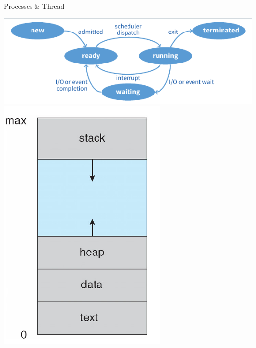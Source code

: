 \documentclass[10pt]{beamer}
\begin{document}
\begin{frame}[allowframebreaks]{Processes \& Thread}
\begin{center}
    \includegraphics[keepaspectratio, width=\textwidth, height=\textheight-2\baselineskip-2\baselineskip]{img/010_proc_state.png} \\ \framebreak
    \includegraphics[keepaspectratio, width=\textwidth, height=\textheight-2\baselineskip-2\baselineskip]{img/010_process_memory.png} \\ \framebreak

\end{center}
\end{frame}
\end{document}
